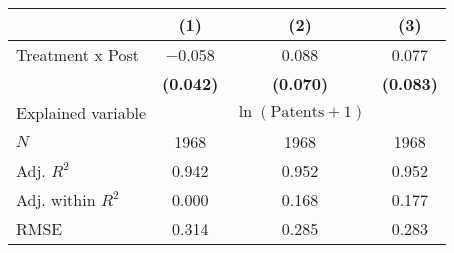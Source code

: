 
\begin{tabular}[t]{lccc}
\toprule
  & (1) & (2) & (3)\\
\midrule
Treatment x Post & \num{-0.058} & \num{0.088} & \num{0.077}\\
\textbf{} & \textbf{(\num{0.042})} & \textbf{(\num{0.070})} & \textbf{(\num{0.083})}\\
\midrule
Explained variable &  & $\ln(\text{Patents}+1)$ & \\
$N$ & \num{1968} & \num{1968} & \num{1968}\\
Adj. $R^2$ & \num{0.942} & \num{0.952} & \num{0.952}\\
Adj. within $R^2$ & \num{0.000} & \num{0.168} & \num{0.177}\\
RMSE & \num{0.314} & \num{0.285} & \num{0.283}\\
\bottomrule
\end{tabular}
